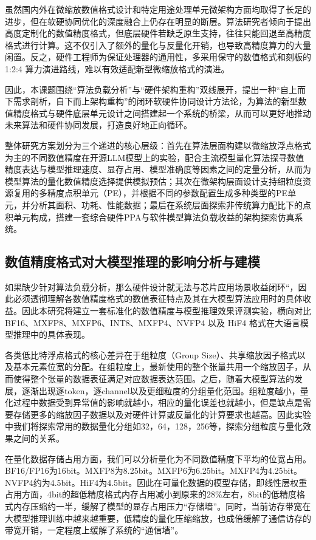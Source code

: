 \documentclass[10.5pt,compsoc,UTF8]{CjC}
\theoremstyle{mystyle}
\begin{document}
虽然国内外在微缩放数值格式设计和特定用途处理单元微架构方面均取得了长足的进步，但在软硬协同优化的深度融合上仍存在明显的断层。算法研究者倾向于提出高度定制化的数值精度格式，但底层硬件若缺乏原生支持，往往只能回退至高精度格式进行计算。这不仅引入了额外的量化与反量化开销，也导致高精度算力的大量闲置。反之，硬件工程师为保证处理器的通用性，多采用保守的数值格式和刻板的 1:2:4 算力演进路线，难以有效适配新型微缩放格式的演进。

因此，本课题围绕“算法负载分析”与“硬件架构重构”双线展开，提出一种“自上而下需求剖析，自下而上架构重构”的闭环软硬件协同设计方法论，为算法的新型数值精度格式与硬件底层单元设计之间搭建起一个系统的桥梁，从而可以更好地推动未来算法和硬件协同发展，打造良好地正向循环。

整体研究方案划分为三个递进的核心层级：首先在算法层面构建以微缩放浮点格式为主的不同数值精度在开源LLM模型上的实验，配合主流模型量化算法探寻数值精度表达与模型推理速度、显存占用、模型准确度等因素之间的定量分析，从而为模型算法的量化数值精度选择提供模拟预估；其次在微架构层面设计支持细粒度资源复用的多精度点积单元（PE），并根据不同的参数配置生成多种类型的PE单元，并分析其面积、功耗、性能数据；最后在系统层面探索非传统算力配比下的点积单元构成，搭建一套综合硬件PPA与软件模型算法负载收益的架构探索仿真系统。

\subsection{数值精度格式对大模型推理的影响分析与建模}

如果缺少针对算法负载分析，那么硬件设计就无法与芯片应用场景收益闭环“，因此必须透彻理解各数值精度格式的数值表征特点及其在大模型算法应用时的具体收益。因此本研究将建立一套标准化的数值精度与模型推理效果评测实验，横向对比 BF16、MXFP8、MXFP6、INT8、MXFP4、NVFP4 以及 HiF4 格式在大语言模型推理中的具体表现。

各类低比特浮点格式的核心差异在于组粒度（Group Size）、共享缩放因子格式以及基本元素位宽的分配。在组粒度上，最新使用的整个张量共用一个缩放因子，从而使得整个张量的数据表征满足对应数据表达范围。之后，随着大模型算法的发展，逐渐出现逐token，逐channel以及更细粒度的分组量化范围。组粒度越小，量化过程中数据受到异常值的影响就越小，相应的量化误差也就越小，但是缺点是需要存储更多的缩放因子数据以及对硬件计算或反量化的计算要求也越高。因此实验中我们将探索常用的数据量化分组如32，64，128，256等，探索分组粒度与量化效果之间的关系。

在量化数据存储占用方面，我们可以分析量化为不同数值精度下平均的位宽占用。BF16/FP16为16bit。MXFP8为8.25bit。MXFP6为6.25bit。MXFP4为4.25bit。NVFP4约为4.5bit。HiF4为4.5bit。因此在可量化数据的模型存储，即线性层权重占用方面，4bit的超低精度格式内存占用减小到原来的28\%左右，8bit的低精度格式内存压缩约一半，缓解了模型的显存占用压力“存储墙”。同时，当前访存带宽在大模型推理训练中越来越重要，低精度的量化压缩缩放，也成倍缓解了通信访存的带宽开销，一定程度上缓解了系统的“通信墙”。
\end{document}
